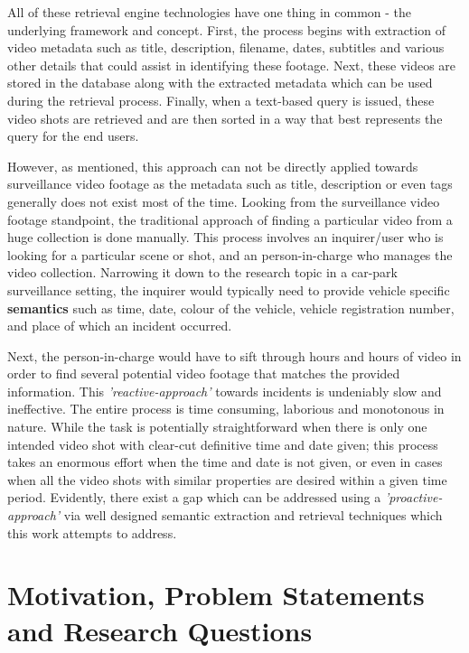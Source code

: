 All of these retrieval engine technologies have one thing in common - the underlying framework and concept. First, the process begins with extraction of video metadata such as title, description, filename, dates, subtitles and various other details that could assist in identifying these footage. Next, these videos are stored in the database along with the extracted metadata which can be used during the retrieval process. Finally, when a text-based query is issued, these video shots are retrieved and are then sorted in a way that best represents the query for the end users.

However, as mentioned, this approach can not be directly applied towards surveillance video footage as the metadata such as title, description or even tags generally does not exist most of the time. Looking from the surveillance video footage standpoint, the traditional approach of finding a particular video from a huge collection is done manually. This process involves an inquirer/user who is looking for a particular scene or shot, and an person-in-charge who manages the video collection. Narrowing it down to the research topic in a car-park surveillance setting, the inquirer would typically need to provide vehicle specific \textbf{semantics} such as time, date, colour of the vehicle, vehicle registration number, and place of which an incident occurred. %

Next, the person-in-charge would have to sift through hours and hours of video in order to find several potential video footage that matches the provided information. This \textit{'reactive-approach'} towards incidents is undeniably slow and ineffective. The entire process is time consuming, laborious and monotonous in nature. While the task is potentially straightforward when there is only one intended video shot with clear-cut definitive time and date given; this process takes an enormous effort when the time and date is not given, or even in cases when all the video shots with similar properties are desired within a given time period. Evidently, there exist a gap which can be addressed using a \textit{'proactive-approach'} via well designed semantic extraction and retrieval techniques which this work attempts to address.

\section{Motivation, Problem Statements and Research Questions}

